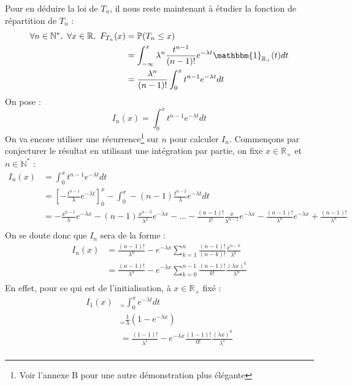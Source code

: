 \documentclass[a4paper, titlepage]{livret} %
\begin{document}
				Pour en déduire la loi de $T_{n}$, il nous reste maintenant à étudier la fonction de répartition de $T_{n}$ : 
				\[\begin{aligned}
					\forall n \in \mathbb{N}^{*}, \ \forall x \in \mathbb{R}, \ F_{T_{n}}(x) & = \mathbb{P}(T_{n} \leq x) \\ 
																							 & = \int_{-\infty}^{x} \lambda^{n} \frac{t^{n-1}}{(n-1)!} e^{-\lambda t} \mathbbm{1}_{\mathbb{R}_{+}}(t)dt\\ 
																							 & = \frac{\lambda^{n}}{(n-1)!} \int_{0}^{x} t^{n-1} e^{-\lambda t}dt
				\end{aligned}\]
				On pose :
				\[
					I_{n}(x) = \int_{0}^{x} t^{n-1} e^{-\lambda t}dt
				\]
				On va encore utiliser une récurrence\footnote{Voir l'annexe B pour une autre démonstration plus élégante} sur $n$ pour calculer $I_{n}$.
				Commençons par conjecturer le résultat en utilisant une intégration par partie, on fixe $x \in \mathbb{R}_{+}$ et $n \in \mathbb{N}^{*}$ :
				\[\begin{aligned}
					I_{n}(x) & = \int_{0}^{x} t^{n-1} e^{-\lambda t}dt \\
						  	 & = \left[ -\frac{t^{n-1}}{\lambda} e^{-\lambda t}\right]_{0}^{x} - \int_{0}^{x} - (n-1)\frac{t^{n-2}}{\lambda} e^{-\lambda t}dt\\
						     & = -\frac{x^{n-1}}{\lambda} e^{-\lambda x} - (n-1)\frac{x^{n-2}}{\lambda^{2}} e^{-\lambda x} - ... -\frac{(n-1)!}{1!}\frac{x}{\lambda^{n-1}} e^{-\lambda x} - \frac{(n-1)!}{\lambda^{n}} e^{-\lambda x} + \frac{(n-1)!}{\lambda^{n}}\\
				\end{aligned}\]
				On se doute donc que $I_{n}$ sera de la forme :
				\[\begin{aligned}
					I_{n}(x) & = \frac{(n-1)!}{\lambda^{n}} -e^{-\lambda x} \sum_{k = 1}^{n} \frac{(n-1)!}{(n-k)!}\frac{x^{n-k}}{\lambda^{k}}\\
						  	 & = \frac{(n-1)!}{\lambda^{n}} -e^{-\lambda x} \sum_{k = 0}^{n-1} \frac{(n-1)!}{k!}\frac{(\lambda x)^{k}}{\lambda^{n}}\\
				\end{aligned}\]
				En effet, pour ce qui est de l'initialisation, à $x \in \mathbb{R}_{+}$ fixé :
				\[\begin{aligned}
					I_{1}(x) &_= \int_{0}^{x} e^{-\lambda t}dt \\
						  	 &_= \frac{1}{\lambda}(1 - e^{-\lambda x})\\
						  	 & = \frac{(1-1)!}{\lambda^{1}} -e^{-\lambda x} \frac{(1-1)!}{0!}\frac{(\lambda x)^{0}}{\lambda^{1}}\\
				\end{aligned}\]
\end{document}
